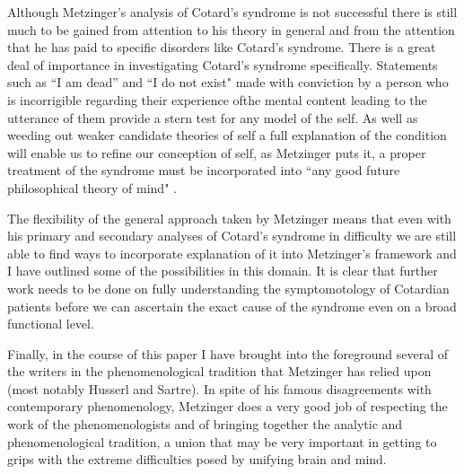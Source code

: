 Although Metzinger's analysis of Cotard's syndrome is not successful there is still much to be gained from attention to his theory in general and from the attention that he has paid to specific disorders like Cotard's syndrome.
There is a great deal of importance in investigating Cotard's syndrome specifically.
Statements such as ``I am dead” and ``I do not exist" made with conviction by a person who is incorrigible regarding their experience ofthe mental content leading to the utterance of them provide a stern test for any model of the self.
As well as weeding out weaker candidate theories of self a full explanation of the condition will enable us to refine our conception of self, as Metzinger puts it, a proper treatment of the syndrome must be incorporated into ``any good future philosophical theory of mind" \cite[p. 455]{metzinger2003}.

The flexibility of the general approach taken by Metzinger means that even with his primary and secondary analyses of Cotard's syndrome in difficulty we are still able to find ways to incorporate explanation of it into Metzinger's framework and I have outlined some of the possibilities in this domain.
It is clear that further work needs to be done on fully understanding the symptomotology of Cotardian patients before we can ascertain the exact cause of the syndrome even on a broad functional level.

Finally, in the course of this paper I have brought into the foreground several of the writers in the phenomenological tradition that Metzinger has relied upon (most notably Husserl and Sartre).
In spite of his famous disagreements with contemporary phenomenology, Metzinger does a very good job of respecting the work of the phenomenologists and of bringing together the analytic and phenomenological tradition, a union that may be very important in getting to grips with the extreme difficulties posed by unifying brain and mind.